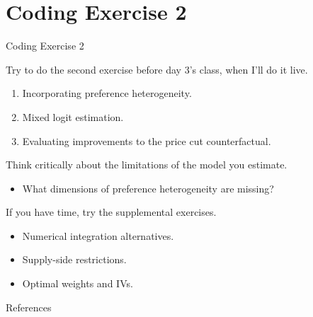 \documentclass[aspectratio=169,t,11pt,table]{beamer}
\begin{document}
\section{Coding Exercise 2}

\begin{frame}{Coding Exercise 2}
    \begin{wideitemize}
        \item Try to do the second exercise before day 3's class, when I'll do it live.
        \begin{enumerate}
            \item Incorporating preference heterogeneity.
            \item Mixed logit estimation.
            \item Evaluating improvements to the price cut counterfactual.
        \end{enumerate}
        \pause
        \item Think critically about the limitations of the model you estimate.
        \begin{itemize}
            \item What dimensions of preference heterogeneity are missing?
        \end{itemize}
        \pause
        \item If you have time, try the supplemental exercises.
        \begin{itemize}
            \item Numerical integration alternatives.
            \item Supply-side restrictions.
            \item Optimal weights and IVs.
        \end{itemize}
    \end{wideitemize}
\end{frame}

\backupbegin

\begin{frame}{References}
    
\end{frame}

\backupend
\end{document}
